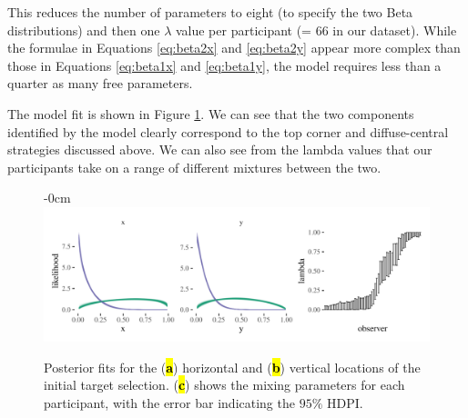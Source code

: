 \documentclass[vision,article,accept,pdftex,moreauthors]{Definitions/mdpi}
\begin{document}
This reduces the number of parameters to eight (to specify the two Beta distributions) and then one $\lambda$ value per participant (= 66 in our dataset). While the formulae in Equations \eqref{eq:beta2x} and \eqref{eq:beta2y} appear more complex than those in Equations \eqref{eq:beta1x} and \eqref{eq:beta1y}, the model requires less than a quarter as many free parameters. 

The model fit is shown in Figure \ref{fig:qjep_init2_sel_mdl}. We can see that the two components identified by the model clearly correspond to the top corner and diffuse-central strategies discussed above. We can also see from the lambda values that our participants take on a range of different mixtures between the two. 
\vspace{-12pt}
\begin{figure}[H]
\begin{adjustwidth}{-\extralength}{0cm}%
\centering
\includegraphics[width=1.3\textwidth]{Figures/init_sel2_mdl.pdf}
\end{adjustwidth}
\caption{Posterior fits for the ({\textbf{\hl{a}}}) horizontal and ({\textbf{\hl{b}}}) vertical locations of the initial target selection. ({\textbf{\hl{c}}}) shows the mixing parameters for each participant, with the error bar indicating the $95\%$ HDPI.}%

\label{fig:qjep_init2_sel_mdl}
\end{figure} 
\end{document}

